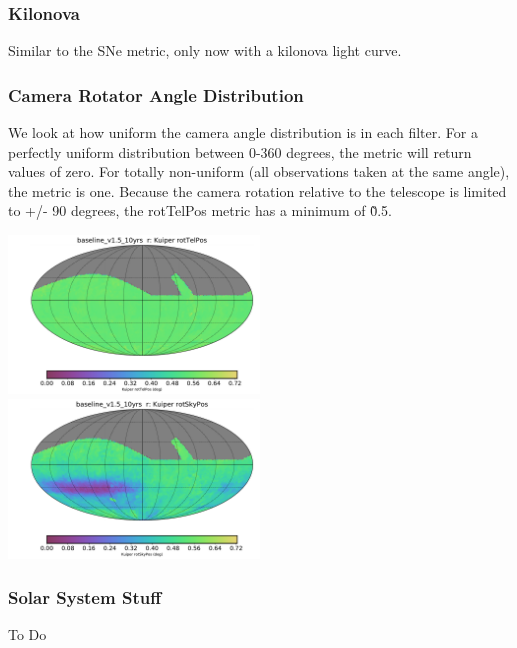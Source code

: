 {\subsubsection{Kilonova}

Similar to the SNe metric, only now with a kilonova light curve.

\subsubsection{Camera Rotator Angle Distribution}

We look at how uniform the camera angle distribution is in each filter. For a perfectly uniform distribution between 0-360 degrees, the metric will return values of zero. For totally non-uniform (all observations taken at the same angle), the metric is one.  Because the camera rotation relative to the telescope is limited to +/- 90 degrees, the rotTelPos metric has a minimum of \~0.5. 

\includegraphics[width=0.5\textwidth]{metric_summary/sci_baseline_v1.5_10yrs/baseline_v1_5_10yrs_Kuiper_rotTelPos_r_HEAL_SkyMap.pdf}
\includegraphics[width=0.5\textwidth]{metric_summary/sci_baseline_v1.5_10yrs/baseline_v1_5_10yrs_Kuiper_rotSkyPos_r_HEAL_SkyMap.pdf}


\subsubsection{Solar System Stuff}

To Do


}
